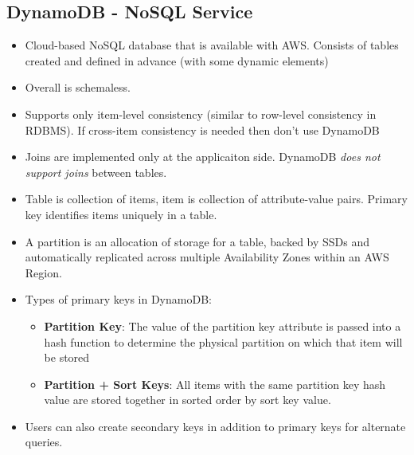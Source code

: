 \documentclass{article}
\begin{document}
\subsection{DynamoDB - NoSQL Service}
\begin{itemize}
    \item Cloud-based NoSQL database that is available with AWS. Consists of tables created and defined in advance (with some dynamic elements)
    
    \item Overall is schemaless.
    
    \item Supports only item-level consistency (similar to row-level consistency in RDBMS). If cross-item consistency is needed then don't use DynamoDB
    
    \item Joins are implemented only at the applicaiton side. DynamoDB \textit{does not support joins} between tables. 
    
    \item Table is collection of items, item is collection of attribute-value pairs. Primary key identifies items uniquely in a table.
    
    \item A partition is an allocation of storage for a table, backed by SSDs and automatically replicated across multiple Availability Zones within an AWS Region. 
    
    \item Types of primary keys in DynamoDB:
    \begin{itemize}
        \item \textbf{Partition Key}: The value of the partition key attribute is passed into a hash function to determine the physical partition on which that item will be stored
        
        \item \textbf{Partition + Sort Keys}:  All items with the same partition key hash value are stored together in sorted order by sort key value.  
    \end{itemize}
    
    \item Users can also create secondary keys in addition to primary keys for alternate queries.
\end{itemize}
\end{document}
